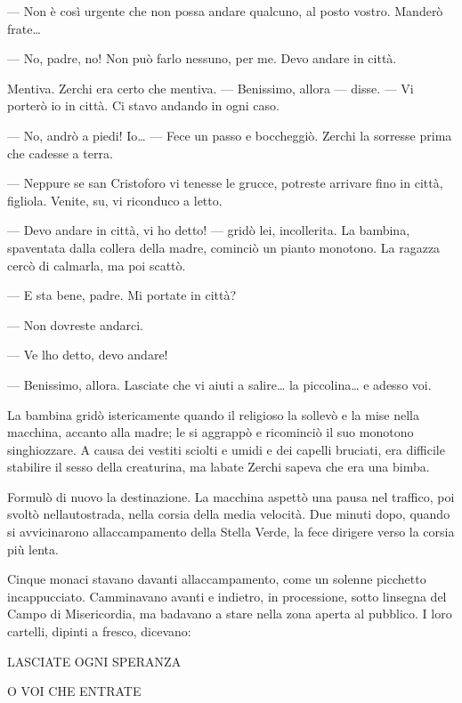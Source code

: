 --- Non è così urgente che non possa andare qualcuno, al posto vostro.
Manderò frate\ldots{}

--- No, padre, no! Non può farlo nessuno, per me. Devo andare in città.

Mentiva. Zerchi era certo che mentiva. --- Benissimo, allora --- disse.
--- Vi porterò io in città. Ci stavo andando in ogni caso.

--- No, andrò a piedi! Io\ldots{} --- Fece un passo e boccheggiò. Zerchi
la sorresse prima che cadesse a terra.

--- Neppure se san Cristoforo vi tenesse le grucce, potreste arrivare
fino in città, figliola. Venite, su, vi riconduco a letto.

--- Devo andare in città, vi ho detto! --- gridò lei, incollerita. La
bambina, spaventata dalla collera della madre, cominciò un pianto
monotono. La ragazza cercò di calmarla, ma poi scattò.

--- E sta bene, padre. Mi portate in città?

--- Non dovreste andarci.

--- Ve l\textquotesingle ho detto, devo andare!

--- Benissimo, allora. Lasciate che vi aiuti a salire\ldots{} la
piccolina\ldots{} e adesso voi.

La bambina gridò istericamente quando il religioso la sollevò e la mise
nella macchina, accanto alla madre; le si aggrappò e ricominciò il suo
monotono singhiozzare. A causa dei vestiti sciolti e umidi e dei capelli
bruciati, era difficile stabilire il sesso della creaturina, ma
l\textquotesingle abate Zerchi sapeva che era una bimba.

Formulò di nuovo la destinazione. La macchina aspettò una pausa nel
traffico, poi svoltò nell\textquotesingle autostrada, nella corsia della
media velocità. Due minuti dopo, quando si avvicinarono
all\textquotesingle accampamento della Stella Verde, la fece dirigere
verso la corsia più lenta.

Cinque monaci stavano davanti all\textquotesingle accampamento, come un
solenne picchetto incappucciato. Camminavano avanti e indietro, in
processione, sotto l\textquotesingle insegna del Campo di Misericordia,
ma badavano a stare nella zona aperta al pubblico. I loro cartelli,
dipinti a fresco, dicevano:

\begin{center}
	LASCIATE OGNI SPERANZA
\end{center}

\begin{center}
	O VOI CHE ENTRATE
\end{center}

